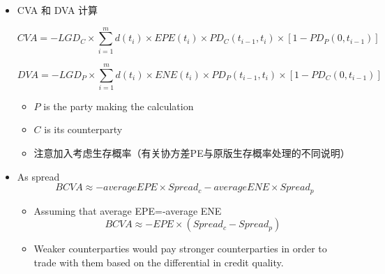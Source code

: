 \begin{itemize}
\begin{itemize}
\item CVA 和 DVA 计算

\[
CVA = -LGD_C \times \sum_{i=1}^{m} d(t_i) \times EPE(t_i) \times PD_C(t_{i-1}, t_i) \times [1 - PD_P(0, t_{i-1})]
\]

\[
DVA = -LGD_P \times \sum_{i=1}^{m} d(t_i) \times ENE(t_i) \times PD_P(t_{i-1}, t_i) \times [1 - PD_C(0, t_{i-1})]
\]

\begin{itemize}
    \item \( P \) is the party making the calculation
    \item \( C \) is its counterparty
    \item 注意加入考虑生存概率（有关协方差PE与原版生存概率处理的不同说明）
\end{itemize}

\item As spread
\[
BCVA \approx -average EPE \times Spread_c- average ENE \times Spread_p
\]
\begin{itemize}
    \item Assuming that average EPE=-average ENE
    \[BCVA \approx -EPE \times (Spread_c-Spread_p)\]
    \item Weaker counterparties would pay stronger counterparties in order to trade with them based on the differential in credit quality.
\end{itemize}


\end{itemize}


\end{itemize}




